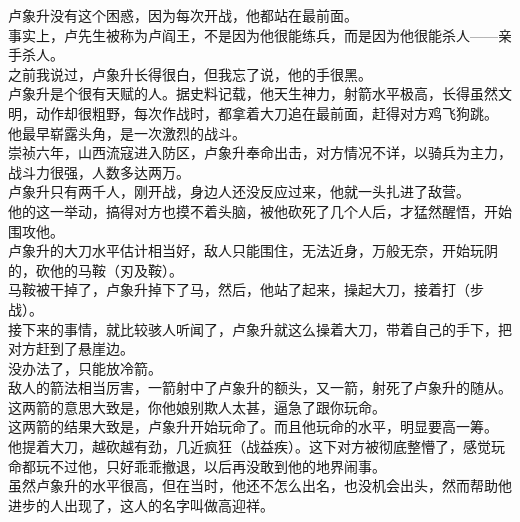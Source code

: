 \begin{multicols}{\theparacolNo}
卢象升没有这个困惑，因为每次开战，他都站在最前面。\\

事实上，卢先生被称为卢阎王，不是因为他很能练兵，而是因为他很能杀人——亲手杀人。\\

之前我说过，卢象升长得很白，但我忘了说，他的手很黑。\\

卢象升是个很有天赋的人。据史料记载，他天生神力，射箭水平极高，长得虽然文明，动作却很粗野，每次作战时，都拿着大刀追在最前面，赶得对方鸡飞狗跳。\\

他最早崭露头角，是一次激烈的战斗。\\

崇祯六年，山西流寇进入防区，卢象升奉命出击，对方情况不详，以骑兵为主力，战斗力很强，人数多达两万。\\

卢象升只有两千人，刚开战，身边人还没反应过来，他就一头扎进了敌营。\\

他的这一举动，搞得对方也摸不着头脑，被他砍死了几个人后，才猛然醒悟，开始围攻他。\\

卢象升的大刀水平估计相当好，敌人只能围住，无法近身，万般无奈，开始玩阴的，砍他的马鞍（刃及鞍）。\\

马鞍被干掉了，卢象升掉下了马，然后，他站了起来，操起大刀，接着打（步战）。\\

接下来的事情，就比较骇人听闻了，卢象升就这么操着大刀，带着自己的手下，把对方赶到了悬崖边。\\

没办法了，只能放冷箭。\\

敌人的箭法相当厉害，一箭射中了卢象升的额头，又一箭，射死了卢象升的随从。\\

这两箭的意思大致是，你他娘别欺人太甚，逼急了跟你玩命。\\

这两箭的结果大致是，卢象升开始玩命了。而且他玩命的水平，明显要高一筹。\\

他提着大刀，越砍越有劲，几近疯狂（战益疾）。这下对方被彻底整懵了，感觉玩命都玩不过他，只好乖乖撤退，以后再没敢到他的地界闹事。\\

虽然卢象升的水平很高，但在当时，他还不怎么出名，也没机会出头，然而帮助他进步的人出现了，这人的名字叫做高迎祥。\\


\end{multicols}
